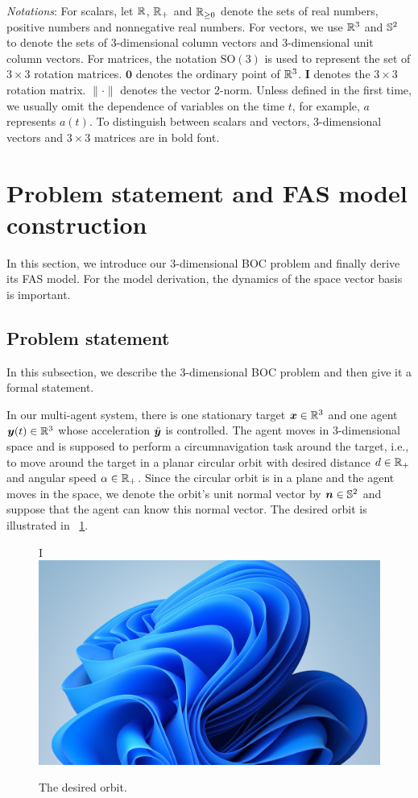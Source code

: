 \documentclass[5p,authoryear,preprint]{elsarticle}\linenofalse
\begin{document}
\emph{Notations}:
For scalars, let $\mathbb{R}$, $\mathbb{R}_+$ and $\mathbb{R}_{\ge0}$ denote the sets of real numbers, positive numbers and nonnegative real numbers.
For vectors, we use $\mathbb{R}^3$ and $\mathbb{S}^2$ to denote the sets of 3-dimensional column vectors and 3-dimensional unit column vectors.
For matrices, the notation $\mathrm{SO}(3)$ is used to represent the set of $3\times3$ rotation matrices.
$\bm0$ denotes the ordinary point of $\mathbb{R}^3$.
$\bm I$ denotes the $3\times3$ rotation matrix.
${\|\cdot\|}$ denotes the vector 2-norm.
Unless defined in the first time, we usually omit the dependence of variables 
on the time $t$, for example, $a$ represents $a(t)$.
To distinguish between scalars and vectors, 3-dimensional vectors and $3\times3$ matrices are in bold font.

\section{Problem statement and FAS model construction}

In this section, we introduce our 3-dimensional BOC problem and finally derive its FAS model.
For the model derivation, the dynamics of the space vector basis is important.

\subsection{Problem statement}

In this subsection, we describe the 3-dimensional BOC problem and then give it a formal statement.

In our multi-agent system, there is one stationary target $\bm{x}\in\mathbb{R}^3$ and one agent $\bm{y}(t)\in\mathbb{R}^3$ whose acceleration $\ddot{\bm{y}}$ is controlled.
The agent moves in 3-dimensional space and is supposed to perform a circumnavigation task around the target, i.e., to move around the target in a planar circular orbit with desired distance $d\in\mathbb{R}_+$ and angular speed $\alpha\in\mathbb{R}_+$.
Since the circular orbit is in a plane and the agent moves in the space, we denote the orbit's unit normal vector by $\bm{n}\in\mathbb{S}^2$ and suppose that the agent can know this normal vector.
The desired orbit is illustrated in \figurename~\ref{fig:desired orbit}.

\begin{figure}[!htbp]
\centering
I\includegraphics[width=0.6\linewidth]{fig/example.png}
\caption{The desired orbit.}
\label{fig:desired orbit}
\end{figure}
\end{document}

